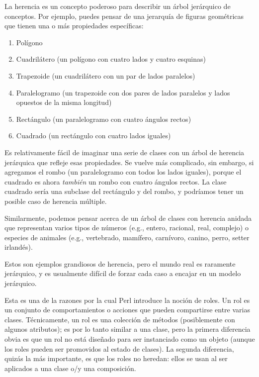La herencia es un concepto poderoso para describir un árbol jerárquico de
conceptos. Por ejemplo, puedes pensar de una jerarquía de figuras geométricas
que tienen una o más propiedades específicas: 
\begin{enumerate}
\item Polígono

\item Cuadrilátero (un polígono con cuatro lados y cuatro esquinas)

\item Trapezoide (un cuadrilátero con un par de lados paralelos)

\item Paralelogramo (un trapezoide con dos pares de lados paralelos y lados
opuestos de la misma longitud)

\item Rectángulo (un paralelogramo con cuatro ángulos rectos)

\item Cuadrado (un rectángulo con cuatro lados iguales)
\end{enumerate}

Es relativamente fácil de imaginar una serie de clases con un árbol de
herencia jerárquica que refleje esas propiedades. Se vuelve más 
complicado, sin embargo, si agregamos el rombo (un paralelogramo con
todos los lados iguales), porque el cuadrado es ahora \emph{también}
un rombo con cuatro ángulos rectos. La clase cuadrado sería una 
subclase del rectángulo y del rombo, y podríamos tener un posible
caso de herencia múltiple.

   
  
 
Similarmente, podemos pensar acerca de un árbol de clases con herencia
anidada que representan varios tipos de números (e.g., entero, 
racional, real, complejo) o especies de animales (e.g., vertebrado, 
mamífero, carnívoro, canino, perro, setter irlandés).

Estos son ejemplos grandiosos de herencia, pero el mundo real es
raramente jerárquico, y es usualmente difícil de forzar cada caso 
a encajar en un modelo jerárquico.

Esta es una de la razones por la cual Perl introduce la noción
de roles. Un rol es un conjunto de comportamientos o acciones
que pueden compartirse entre varias clases. Técnicamente, un rol
es una colección de métodos (posiblemente con algunos atributos);
es por lo tanto similar a una clase, pero la primera diferencia
obvia es que un rol no está diseñado para ser instanciado como
un objeto (aunque los roles pueden ser promovidos al estado de
clases). La segunda diferencia, quizás la más importante, es que los
roles no heredan: ellos se usan al ser aplicados a una clase 
o/y una composición.

